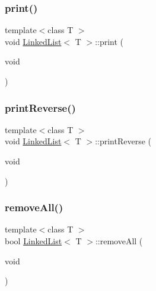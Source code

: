 \subsubsection{\texorpdfstring{print()}{print()}}
{\footnotesize\ttfamily template$<$class T $>$ \\
void \hyperlink{class_linked_list}{Linked\+List}$<$ T $>$\+::print (\begin{DoxyParamCaption}\item[{void}]{ }\end{DoxyParamCaption})}

\mbox{\label{class_linked_list_a3a34150ae8af3f78f1d18c828d5cb2f5}} 
\subsubsection{\texorpdfstring{print\+Reverse()}{printReverse()}}
{\footnotesize\ttfamily template$<$class T $>$ \\
void \hyperlink{class_linked_list}{Linked\+List}$<$ T $>$\+::print\+Reverse (\begin{DoxyParamCaption}\item[{void}]{ }\end{DoxyParamCaption})}

\mbox{\label{class_linked_list_ae3231ec92da15fef89494fb709a4ac40}} 
\subsubsection{\texorpdfstring{remove\+All()}{removeAll()}}
{\footnotesize\ttfamily template$<$class T $>$ \\
bool \hyperlink{class_linked_list}{Linked\+List}$<$ T $>$\+::remove\+All (\begin{DoxyParamCaption}\item[{void}]{ }\end{DoxyParamCaption})}

\mbox{\label{class_linked_list_a59d52f0573972f2e806014dd95245f9f}} 
